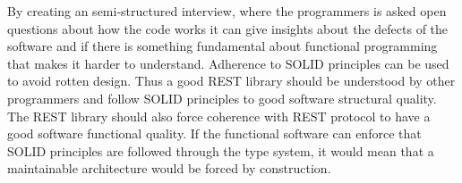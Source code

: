 By creating an semi-structured interview, where the programmers is asked open
questions about how the code works it can give insights about the defects of the
software and if there is something fundamental about functional programming that
makes it harder to understand. Adherence to SOLID principles can be used to
avoid rotten design. Thus a good REST library should be understood by other
programmers and follow SOLID principles to good software structural quality. The
REST library should also force coherence with REST protocol to have a good
software functional quality. If the functional software can enforce that SOLID
principles are followed through the type system, it would mean that a
maintainable architecture would be forced by construction.
